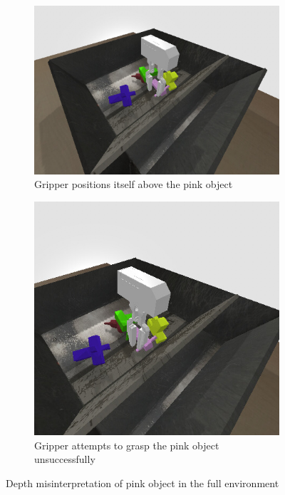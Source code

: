 \begin{enumerate}
\begin{figure}[!htbp]
\begin{subfigure}{0.49\textwidth}
                \includegraphics[width=\linewidth]{figures/failure/tablefailure2}
                \caption{Gripper positions itself above the pink object} \label{fig:table}
            \end{subfigure}%
            \hspace*{\fill}   %
            \begin{subfigure}{0.49\textwidth}
                \includegraphics[width=\linewidth]{figures/failure/tablefailure1}
                \caption{Gripper attempts to grasp the pink object unsuccessfully} \label{fig:floor}
            \end{subfigure}%
            \hspace*{\fill}   %
            \caption{ Depth misinterpretation of pink object in the full environment\label{fig:scenes}}
        \end{figure}


\end{enumerate}
